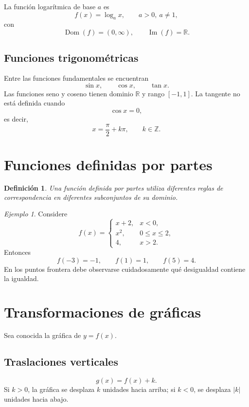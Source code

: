 \documentclass[12pt]{article}
\newtheorem{definicion}{Definición}[section]
\theoremstyle{remark}
\newtheorem{ejemplo}{Ejemplo}[section]
\newcommand{\R}{\mathbb{R}}
\newcommand{\Dom}{\operatorname{Dom}}
\newcommand{\Ima}{\operatorname{Im}}
\begin{document}
La función logarítmica de base $a$ es
\[
f(x)=\log_a x,
\qquad a>0,\ a\neq1,
\]
con
\[
\Dom(f)=(0,\infty),\qquad\Ima(f)=\R.
\]

\subsection{Funciones trigonométricas}

Entre las funciones fundamentales se encuentran
\[
\sin x,\qquad\cos x,\qquad\tan x.
\]
Las funciones seno y coseno tienen dominio $\R$ y rango $[-1,1]$. La tangente
no está definida cuando
\[
\cos x=0,
\]
es decir,
\[
x=\frac{\pi}{2}+k\pi,\qquad k\in\mathbb Z.
\]

\section{Funciones definidas por partes}

\begin{definicion}
Una función definida por partes utiliza diferentes reglas de correspondencia en
diferentes subconjuntos de su dominio.
\end{definicion}

\begin{ejemplo}
Considere
\[
f(x)=
\begin{cases}
x+2,&x<0,\\
x^2,&0\leq x\leq2,\\
4,&x>2.
\end{cases}
\]
Entonces
\[
f(-3)=-1,\qquad f(1)=1,\qquad f(5)=4.
\]
En los puntos frontera debe observarse cuidadosamente qué desigualdad contiene
la igualdad.
\end{ejemplo}

\section{Transformaciones de gráficas}

Sea conocida la gráfica de $y=f(x)$.

\subsection{Traslaciones verticales}

\[
g(x)=f(x)+k.
\]
Si $k>0$, la gráfica se desplaza $k$ unidades hacia arriba; si $k<0$, se
desplaza $|k|$ unidades hacia abajo.
\end{document}
